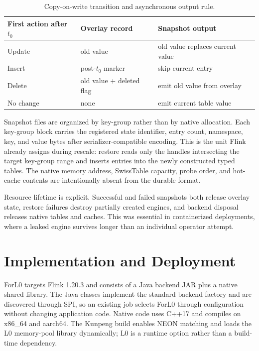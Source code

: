 \documentclass[sigconf]{acmart}
\newcommand{\forlzero}{ForL0\xspace}
\newcommand{\system}{\forlzero}
\begin{document}
\begin{table}[t]
\caption{Copy-on-write transition and asynchronous output rule.}
\label{tab:cow-rules}
\centering
\small
\begin{tabularx}{\columnwidth}{L{1.45cm}L{2.55cm}Y}
\toprule
First action after $t_0$ & Overlay record & Snapshot output \\
\midrule
Update & old value & old value replaces current value \\
Insert & post-$t_0$ marker & skip current entry \\
Delete & old value + deleted flag & emit old value from overlay \\
No change & none & emit current table value \\
\bottomrule
\end{tabularx}
\end{table}

Snapshot files are organized by key-group rather than by native allocation. Each key-group block carries the registered state identifier, entry count, namespace, key, and value bytes after serializer-compatible encoding. This is the unit Flink already assigns during rescale: restore reads only the handles intersecting the target key-group range and inserts entries into the newly constructed typed tables. The native memory address, SwissTable capacity, probe order, and hot-cache contents are intentionally absent from the durable format.

Resource lifetime is explicit. Successful and failed snapshots both release overlay state, restore failures destroy partially created engines, and backend disposal releases native tables and caches. This was essential in containerized deployments, where a leaked engine survives longer than an individual operator attempt.

\section{Implementation and Deployment}

\system targets Flink 1.20.3 and consists of a Java backend JAR plus a native shared library. The Java classes implement the standard backend factory and are discovered through SPI, so an existing job selects \system through configuration without changing application code. Native code uses C++17 and compiles on x86\_64 and aarch64. The Kunpeng build enables NEON matching and loads the L0 memory-pool library dynamically; L0 is a runtime option rather than a build-time dependency.
\end{document}
